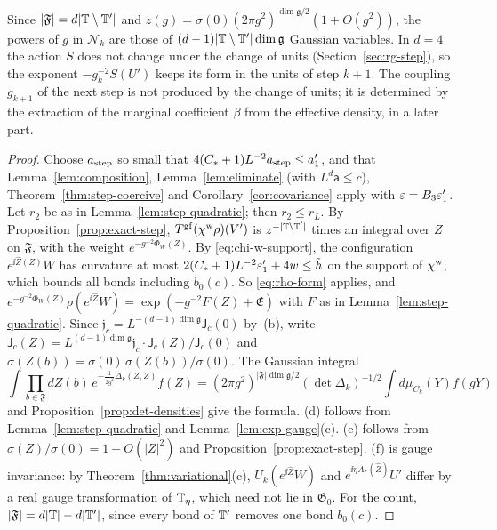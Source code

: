 \begin{theorem}
\begin{enumerate}[label=(\alph*)]
\end{enumerate}
Since $|\mathfrak F|=d|\mathbb T\setminus\mathbb T'|$ and $z(g)=\sigma(0)(2\pi g^2)^{\dim\mathfrak g/2}(1+O(g^2))$, the powers of $g$ in $\mathcal N_k$ are those of $(d-1)|\mathbb T\setminus\mathbb T'|\dim\mathfrak g$ Gaussian variables. In $d=4$ the action $S$ does not change under the change of units (Section~\ref{sec:rg-step}), so the exponent $-g_k^{-2}S(U')$ keeps its form in the units of step $k+1$. The coupling $g_{k+1}$ of the next step is not produced by the change of units; it is determined by the extraction of the marginal coefficient $\beta$ from the effective density, in a later part.
\end{theorem}

\begin{proof}
Choose $a_{\rm step}$ so small that $4(C_*+1)L^{-2}a_{\rm step}\le a'_1$, and that Lemma~\ref{lem:composition}, Lemma~\ref{lem:eliminate} (with $L^d\mathsf a\le c$), Theorem~\ref{thm:step-coercive} and Corollary~\ref{cor:covariance} apply with $\varepsilon=B_3\varepsilon'_1$. Let $r_2$ be as in Lemma~\ref{lem:step-quadratic}; then $r_2\le r_L$. By Proposition~\ref{prop:exact-step}, $T^{\rm gf}(\chi^{\rm w}\rho)(V')$ is $z^{-|\mathbb T\setminus\mathbb T'|}$ times an integral over $Z$ on $\mathfrak F$, with the weight $e^{-g^{-2}\Phi_W(Z)}$. By \eqref{eq:chi-w-support}, the configuration $e^{\ii\hat Z(Z)}W$ has curvature at most $2(C_*+1)L^{-2}\varepsilon'_1+4w\le\tilde h$ on the support of $\chi^{\rm w}$, which bounds all bonds including $b_0(c)$. So \eqref{eq:rho-form} applies, and $e^{-g^{-2}\Phi_W(Z)}\rho(e^{\ii\hat Z}W)=\exp(-g^{-2}F(Z)+\mathfrak E)$ with $F$ as in Lemma~\ref{lem:step-quadratic}. Since $\mathfrak j_c=L^{-(d-1)\dim\mathfrak g}\mathsf J_c(0)$ by~(b), write $\mathsf J_c(Z)=L^{(d-1)\dim\mathfrak g}\mathfrak j_c\cdot\mathsf J_c(Z)/\mathsf J_c(0)$ and $\sigma(Z(b))=\sigma(0)\,\sigma(Z(b))/\sigma(0)$. The Gaussian integral
\[
\int\prod_{b\in\mathfrak F}dZ(b)\,e^{-\frac1{2g^2}\Delta_k(Z,Z)}f(Z)=(2\pi g^2)^{|\mathfrak F|\dim\mathfrak g/2}(\det\Delta_k)^{-1/2}\int d\mu_{C_k}(Y)f(gY)
\]
and Proposition~\ref{prop:det-densities} give the formula. (d) follows from Lemma~\ref{lem:step-quadratic} and Lemma~\ref{lem:exp-gauge}(c). (e) follows from $\sigma(Z)/\sigma(0)=1+O(|Z|^2)$ and Proposition~\ref{prop:exact-step}. (f) is gauge invariance: by Theorem~\ref{thm:variational}(c), $U_k(e^{\ii\hat Z}W)$ and $e^{\ii\eta A_*(\hat Z)}U'$ differ by a real gauge transformation of $\mathbb T_\eta$, which need not lie in $\mathfrak G_0$. For the count, $|\mathfrak F|=d|\mathbb T|-d|\mathbb T'|$, since every bond of $\mathbb T'$ removes one bond $b_0(c)$.
\end{proof}

